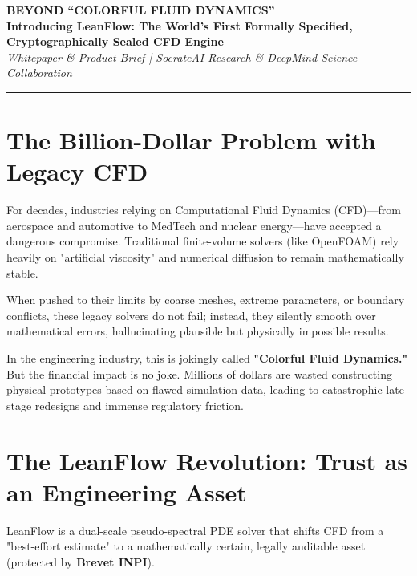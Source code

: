 \documentclass[11pt,a4paper]{article}
\begin{document}
\begin{center}
    {\Huge \bfseries BEYOND ``COLORFUL FLUID DYNAMICS''} \\ \vspace{0.5cm}
    {\Large \bfseries Introducing LeanFlow: The World’s First Formally Specified, Cryptographically Sealed CFD Engine} \\ \vspace{0.3cm}
    {\large \textit{Whitepaper \& Product Brief | SocrateAI Research \& DeepMind Science Collaboration}}
\end{center}

\vspace{0.5cm}
\hrule
\vspace{0.5cm}

\section*{The Billion-Dollar Problem with Legacy CFD}

For decades, industries relying on Computational Fluid Dynamics (CFD)---from aerospace and automotive to MedTech and nuclear energy---have accepted a dangerous compromise. Traditional finite-volume solvers (like OpenFOAM) rely heavily on "artificial viscosity" and numerical diffusion to remain mathematically stable. 

When pushed to their limits by coarse meshes, extreme parameters, or boundary conflicts, these legacy solvers do not fail; instead, they silently smooth over mathematical errors, hallucinating plausible but physically impossible results.

\begin{tcolorbox}[colback=red!5!white,colframe=red!75!black,title=WARNING]
In the engineering industry, this is jokingly called \textbf{"Colorful Fluid Dynamics."} But the financial impact is no joke. Millions of dollars are wasted constructing physical prototypes based on flawed simulation data, leading to catastrophic late-stage redesigns and immense regulatory friction.
\end{tcolorbox}

\section*{The LeanFlow Revolution: Trust as an Engineering Asset}

LeanFlow is a dual-scale pseudo-spectral PDE solver that shifts CFD from a "best-effort estimate" to a mathematically certain, legally auditable asset (protected by \textbf{Brevet INPI}).
\end{document}
